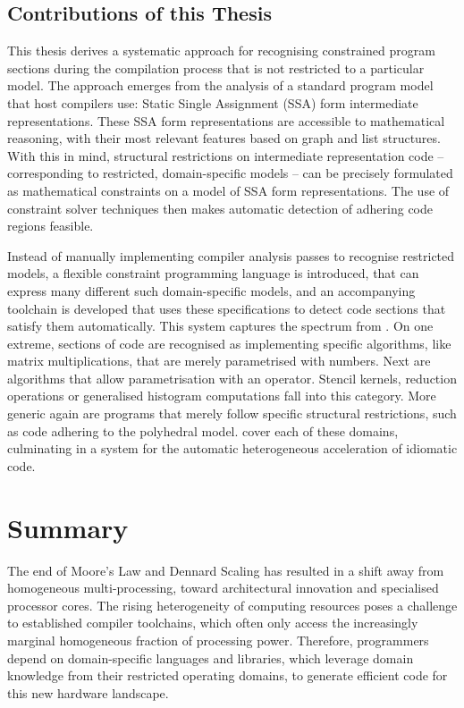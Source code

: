 \subsection{Contributions of this Thesis}

    This thesis derives a systematic approach for recognising constrained
    program sections during the compilation process that is not restricted to a
    particular model.
    The approach emerges from the analysis of a standard program model that host
    compilers use: Static Single Assignment (SSA) form intermediate
    representations.
    These SSA form representations are accessible to mathematical reasoning,
    with their most relevant features based on graph and list structures.
    With this in mind, structural restrictions on intermediate representation
    code -- corresponding to restricted, domain-specific models -- can be
    precisely formulated as mathematical constraints on a model of SSA form
    representations.
    The use of constraint solver techniques then makes automatic detection of
    adhering code regions feasible.

    Instead of manually implementing compiler analysis passes to recognise
    restricted models, a flexible constraint programming language is introduced,
    that can express many different such domain-specific models, and an
    accompanying toolchain is developed that uses these specifications to
    detect code sections that satisfy them automatically.
    This system captures the spectrum from .
    On one extreme, sections of code are recognised as implementing
    specific algorithms, like matrix multiplications, that are merely
    parametrised with numbers.
    Next are algorithms that allow parametrisation with an operator.
    Stencil kernels, reduction operations or generalised histogram computations
    fall into this category.
    More generic again are programs that merely follow specific structural
    restrictions, such as code adhering to the polyhedral model.
     cover each of these
    domains, culminating in a system for the automatic heterogeneous
    acceleration of idiomatic code.

\section{Summary}

    The end of Moore's Law and Dennard Scaling has resulted in a shift away from
    homogeneous multi-processing, toward architectural innovation and
    specialised processor cores.
    The rising heterogeneity of computing resources poses a challenge to
    established compiler toolchains, which often only access the increasingly
    marginal homogeneous fraction of processing power.
    Therefore, programmers depend on domain-specific languages and libraries,
    which leverage domain knowledge from their restricted operating domains, to
    generate efficient code for this new hardware landscape.

